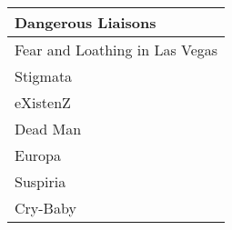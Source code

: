 \documentclass[dvipsnames]{beamer}
\theoremstyle{plain}
\begin{document}
\begin{frame}[fragile]
\begin{columns}[b]
      \begin{tiny}
      \begin{table}
        \begin{tabular}{|l|}\hline
Dangerous Liaisons            \\\hline
Fear and Loathing in Las Vegas\\\hline
Stigmata                      \\\hline
eXistenZ                      \\\hline
Dead Man                      \\\hline
Europa                        \\\hline
Suspiria                      \\\hline
Cry-Baby                      \\\hline
        \end{tabular}
      \end{table}
      \end{tiny}
    \end{columns}
\end{frame}
\end{document}
